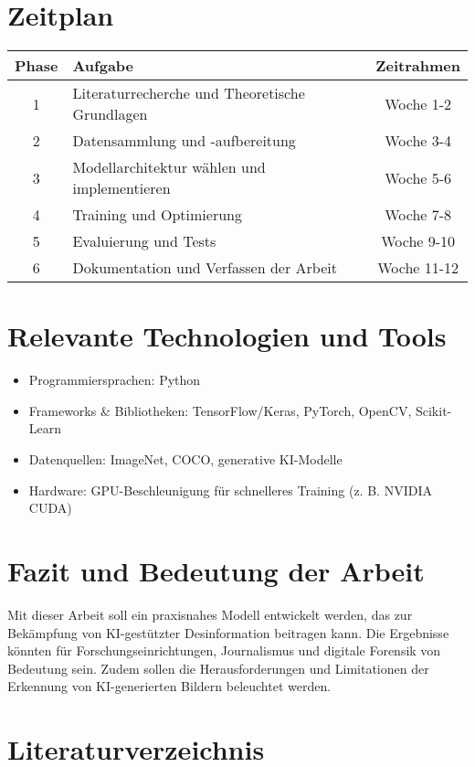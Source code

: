 \documentclass[a4paper,12pt]{article}
\begin{document}
\section{Zeitplan}

\begin{tabular}{|c|l|c|}
\hline
\textbf{Phase} & \textbf{Aufgabe} & \textbf{Zeitrahmen} \\
\hline
1 & Literaturrecherche und Theoretische Grundlagen & Woche 1-2 \\
2 & Datensammlung und -aufbereitung & Woche 3-4 \\
3 & Modellarchitektur wählen und implementieren & Woche 5-6 \\
4 & Training und Optimierung & Woche 7-8 \\
5 & Evaluierung und Tests & Woche 9-10 \\
6 & Dokumentation und Verfassen der Arbeit & Woche 11-12 \\
\hline
\end{tabular}

\section{Relevante Technologien und Tools}

\begin{itemize}
    \item Programmiersprachen: Python
    \item Frameworks \& Bibliotheken: TensorFlow/Keras, PyTorch, OpenCV, Scikit-Learn
    \item Datenquellen: ImageNet, COCO, generative KI-Modelle
    \item Hardware: GPU-Beschleunigung für schnelleres Training (z. B. NVIDIA CUDA)
\end{itemize}

\section{Fazit und Bedeutung der Arbeit}

Mit dieser Arbeit soll ein praxisnahes Modell entwickelt werden, das zur Bekämpfung von KI-gestützter Desinformation beitragen kann. Die Ergebnisse könnten für Forschungseinrichtungen, Journalismus und digitale Forensik von Bedeutung sein. Zudem sollen die Herausforderungen und Limitationen der Erkennung von KI-generierten Bildern beleuchtet werden.

\section{Literaturverzeichnis}
\end{document}
